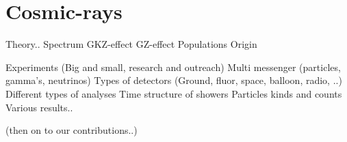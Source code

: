 \chapter{Cosmic-rays}
\label{ch:cosmic-rays}

Theory..
Spectrum
GKZ-effect
GZ-effect
Populations
Origin

Experiments (Big and small, research and outreach)
Multi messenger (particles, gamma's, neutrinos)
Types of detectors (Ground, fluor, space, balloon, radio, ..)
Different types of analyses
Time structure of showers
Particles kinds and counts
Various results..

(then on to our contributions..)
